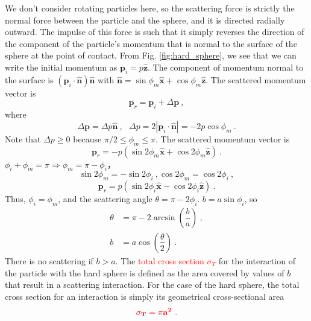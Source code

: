 \documentclass[12pt,a4paper]{article}
\renewcommand{\vec}[1]{\boldsymbol{#1}}
\begin{document}
We don't consider rotating particles here, so the scattering force is strictly the normal force between the particle and the sphere, and it is directed radially outward. The impulse of this force is such that it simply reverses the direction of the component of the particle’s momentum that is normal to the surface of the sphere at the point of contact. From Fig. \ref{fig:hard_sphere}, we see that we can write the initial momentum as $\vec{p}_i = p \vec{\hat{z}}$. The component of momentum normal to the surface is $(\vec{p}_i \cdot \vec{\hat{n}}) \vec{\hat{n}}$ with $ \vec{\hat{n}} = \sin \phi_m \vec{\hat{x}} + \cos \phi_m \vec{\hat{z}}$. The scattered momentum vector is 
\begin{equation}
\vec{p}_r = \vec{p}_i +\Delta \vec{p} ~,
\end{equation}
where
\begin{equation}
\Delta \vec{p} = \Delta p \vec{\hat{n}} ~, ~~~ \Delta p = 2 |\vec{p}_i \cdot \vec{\hat{n}}| = -2 p \cos \phi_m ~.
\end{equation}
Note that $\Delta p \geqslant 0$ because $\pi/2 \leqslant \phi_m \leqslant \pi$. The scattered momentum vector is
\begin{equation}
\vec{p}_r = -p (\sin 2\phi_m \vec{\hat{x} } + \cos 2 \phi_m \vec{\hat{z}}) ~.
\end{equation}
$\phi_i + \phi_m = \pi \Longrightarrow \phi_m = \pi - \phi_i$，
\begin{equation}
\sin 2\phi_m = -\sin 2\phi_i ~, \cos 2\phi_m = \cos 2\phi_i ~,
\end{equation}
\begin{equation}
\vec{p}_r = p (\sin 2\phi_i \vec{\hat{x}} - \cos 2 \phi_i \vec{\hat{z}} ) ~.
\end{equation}
Thus, $\phi_i = \phi_m$, and the scattering angle $\theta = \pi - 2\phi_i$. $b = a \sin \phi_i$, so
\begin{align}
\theta &= \pi - 2 \arcsin \left(\dfrac{b}{a} \right) ~, \\
b &= a \cos \left(\dfrac{\theta}{2} \right) ~.
\end{align}
There is no scattering if $b > a$. The \textcolor{red}{total cross section $\sigma_T$} for the interaction of the particle with the hard sphere is defined as the area covered by values of $b$ that result in a scattering interaction. For the case of the hard sphere, the total cross section for an interaction is simply its geometrical cross-sectional area
\begin{equation}
\color{red}  \bf \sigma_T = \pi a^2 ~.
\end{equation}
\end{document}
